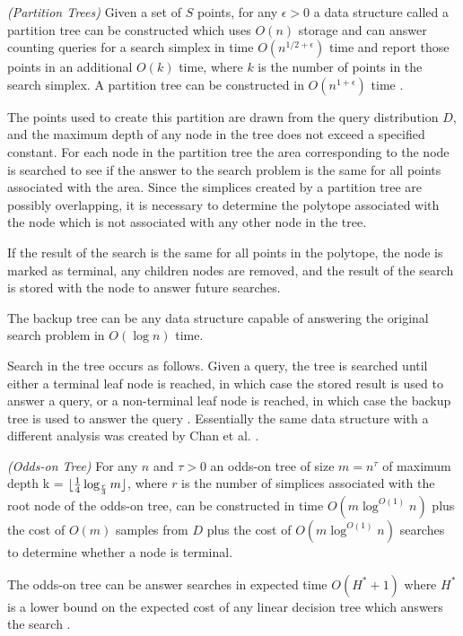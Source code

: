 \documentclass[mcs]{scsthesis}
\begin{document}
\begin{thm} \emph{(Partition Trees)} 
Given a set of \(S\) points, for any \(\epsilon > 0\) a data structure called
a partition tree can be constructed which uses \(O(n)\) storage and can answer
counting queries for a search simplex in time \(O(n^{1/2 + \epsilon})\) time and
report those points in an additional \(O(k)\) time, where \(k\) is the number
of points in the search simplex. A partition tree can be constructed in
\(O(n^{1 + \epsilon})\) time \cite{dutch}.
\end{thm}

The points used to create this partition are drawn from the query distribution
\(D\), and the maximum depth of any node in the tree does not exceed a specified
constant. For each node in the partition tree the area corresponding to the node
is searched to see if the answer to the search problem is the same for all points
associated with the area. Since the simplices created by a partition tree are
possibly overlapping, it is necessary to determine the polytope associated with
the node which is not associated with any other node in the tree.

If the result of the search is the same for all points in the polytope, the node
is marked as terminal, any children nodes are removed, and the result of the
search is stored with the node to answer future searches.

The backup tree can be any data structure capable of answering the original
search problem in \(O(\log n)\) time.

Search in the tree occurs as follows. Given a query, the tree is searched until
either a terminal leaf node is reached, in which case the stored result is used
to answer a query, or a non-terminal leaf node is reached, in which case the
backup tree is used to answer the query \cite{oddson}. Essentially the same data
structure with a different analysis was created by Chan et al. \cite{chan}.

\begin{thm} \emph{(Odds-on Tree)}
For any \(n\) and \(\tau>0\) an odds-on tree of size \(m = n^\tau\) of maximum
depth k = \(\lfloor {1 \over 4} \log_{r \over 3} m \rfloor \), where \(r\) is
the number of simplices associated with the root node of the odds-on tree, can
be constructed in time \(O(m \log^{O(1)} n)\) plus the cost of \(O(m)\) samples
from \(D\) plus the cost of \(O(m \log^{O(1)} n)\) searches to determine whether
a node is terminal.

The odds-on tree can be answer searches in expected time \(O(H^* + 1)\) where
\(H^*\) is a lower bound on the expected cost of any linear decision tree
which answers the search \cite{oddson}.  
\end{thm}
\end{document}
